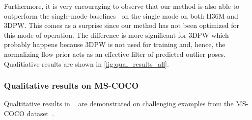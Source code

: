 Furthermore, it is very encouraging to observe that our method is also able to outperform the single-mode baselines~\cite{kanazawa18end-to-end,kolotouros19convolutional,kolotouros19learning} on the single mode \MPJPE on both H36M and 3DPW. 
This comes as a surprise since our method has not been optimized for this mode of operation.
The difference is more significant for 3DPW which probably happens because 3DPW is not used for training and, hence, the normalizing flow prior acts as an effective filter of predicted outlier poses. Qualitiative results are shown in \cref{fig:qual_results_all}.



\subsubsection{Qualitative results on MS-COCO} \label{s:supp_qual}
Qualtitative results in ~ are demonstrated on challenging examples from the MS-COCO dataset~\cite{lin2014microsoft}.





